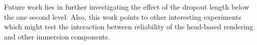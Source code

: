 \documentclass{acmsiggraph}                     %
\begin{document}
Future work lies in further investigating the effect of the dropout length 
below the one second level.  Also, this work points to other interesting experiments which might test the interaction between reliability of the head-based rendering and other immersion components.




\end{document}
